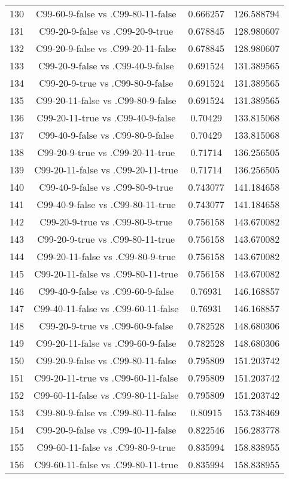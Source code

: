 \documentclass[a4paper,10pt]{article}
\begin{document}
\begin{landscape}
\begin{table}[!htp]
\begin{tabular}{cccc}
130&C99-60-9-false vs .C99-80-11-false&0.666257&126.588794\\
131&C99-20-9-false vs .C99-20-9-true&0.678845&128.980607\\
132&C99-20-9-false vs .C99-20-11-false&0.678845&128.980607\\
133&C99-20-9-false vs .C99-40-9-false&0.691524&131.389565\\
134&C99-20-9-true vs .C99-80-9-false&0.691524&131.389565\\
135&C99-20-11-false vs .C99-80-9-false&0.691524&131.389565\\
136&C99-20-11-true vs .C99-40-9-false&0.70429&133.815068\\
137&C99-40-9-false vs .C99-80-9-false&0.70429&133.815068\\
138&C99-20-9-true vs .C99-20-11-true&0.71714&136.256505\\
139&C99-20-11-false vs .C99-20-11-true&0.71714&136.256505\\
140&C99-40-9-false vs .C99-80-9-true&0.743077&141.184658\\
141&C99-40-9-false vs .C99-80-11-true&0.743077&141.184658\\
142&C99-20-9-true vs .C99-80-9-true&0.756158&143.670082\\
143&C99-20-9-true vs .C99-80-11-true&0.756158&143.670082\\
144&C99-20-11-false vs .C99-80-9-true&0.756158&143.670082\\
145&C99-20-11-false vs .C99-80-11-true&0.756158&143.670082\\
146&C99-40-9-false vs .C99-60-9-false&0.76931&146.168857\\
147&C99-40-11-false vs .C99-60-11-false&0.76931&146.168857\\
148&C99-20-9-true vs .C99-60-9-false&0.782528&148.680306\\
149&C99-20-11-false vs .C99-60-9-false&0.782528&148.680306\\
150&C99-20-9-false vs .C99-80-11-false&0.795809&151.203742\\
151&C99-20-11-true vs .C99-60-11-false&0.795809&151.203742\\
152&C99-60-11-false vs .C99-80-11-false&0.795809&151.203742\\
153&C99-80-9-false vs .C99-80-11-false&0.80915&153.738469\\
154&C99-20-9-false vs .C99-40-11-false&0.822546&156.283778\\
155&C99-60-11-false vs .C99-80-9-true&0.835994&158.838955\\
156&C99-60-11-false vs .C99-80-11-true&0.835994&158.838955\\

\end{tabular}
\end{table}
\end{landscape}
\end{document}
